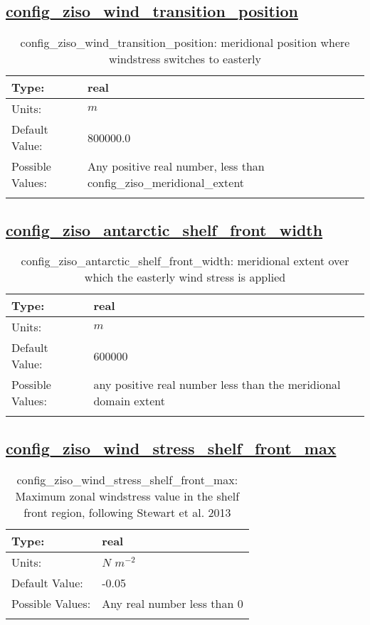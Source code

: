 \subsection[config\_ziso\_wind\_transition\_position]{\hyperref[sec:nm_tab_ziso]{config\_ziso\_wind\_transition\_position}}
\label{subsec:nm_sec_config_ziso_wind_transition_position}
\begin{center}
\begin{longtable}{| p{2.0in} || p{4.0in} |}
    \hline
    Type: & real \\
    \hline
    Units: & $m$ \\
    \hline
    Default Value: & 800000.0 \\
    \hline
    Possible Values: & Any positive real number, less than config\_ziso\_meridional\_extent \\
    \hline
    \caption{config\_ziso\_wind\_transition\_position: meridional position where windstress switches to easterly}
\end{longtable}
\end{center}
\subsection[config\_ziso\_antarctic\_shelf\_front\_width]{\hyperref[sec:nm_tab_ziso]{config\_ziso\_antarctic\_shelf\_front\_width}}
\label{subsec:nm_sec_config_ziso_antarctic_shelf_front_width}
\begin{center}
\begin{longtable}{| p{2.0in} || p{4.0in} |}
    \hline
    Type: & real \\
    \hline
    Units: & $m$ \\
    \hline
    Default Value: & 600000 \\
    \hline
    Possible Values: & any positive real number less than the meridional domain extent \\
    \hline
    \caption{config\_ziso\_antarctic\_shelf\_front\_width: meridional extent over which the easterly wind stress is applied}
\end{longtable}
\end{center}
\subsection[config\_ziso\_wind\_stress\_shelf\_front\_max]{\hyperref[sec:nm_tab_ziso]{config\_ziso\_wind\_stress\_shelf\_front\_max}}
\label{subsec:nm_sec_config_ziso_wind_stress_shelf_front_max}
\begin{center}
\begin{longtable}{| p{2.0in} || p{4.0in} |}
    \hline
    Type: & real \\
    \hline
    Units: & $N$ $m^{-2}$ \\
    \hline
    Default Value: & -0.05 \\
    \hline
    Possible Values: & Any real number less than 0 \\
    \hline
    \caption{config\_ziso\_wind\_stress\_shelf\_front\_max: Maximum zonal windstress value in the shelf front region, following Stewart et al. 2013}
\end{longtable}
\end{center}
